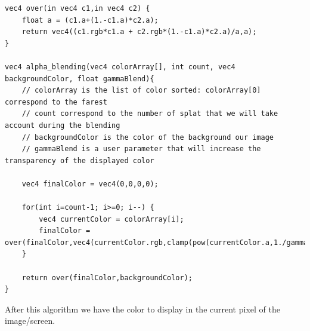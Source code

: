 

\lstset{escapechar=@,style=customc}

\begin{lstlisting}
vec4 over(in vec4 c1,in vec4 c2) {
    float a = (c1.a+(1.-c1.a)*c2.a);
    return vec4((c1.rgb*c1.a + c2.rgb*(1.-c1.a)*c2.a)/a,a);
}

vec4 alpha_blending(vec4 colorArray[], int count, vec4 backgroundColor, float gammaBlend){
    // colorArray is the list of color sorted: colorArray[0] correspond to the farest
    // count correspond to the number of splat that we will take account during the blending
    // backgroundColor is the color of the background our image
    // gammaBlend is a user parameter that will increase the transparency of the displayed color

    vec4 finalColor = vec4(0,0,0,0);

    for(int i=count-1; i>=0; i--) {
        vec4 currentColor = colorArray[i];
        finalColor = over(finalColor,vec4(currentColor.rgb,clamp(pow(currentColor.a,1./gammaBlend),0.,1.)));
    }

    return over(finalColor,backgroundColor);
}
\end{lstlisting}

After this algorithm we have the color to display in the current pixel of the image/screen.


